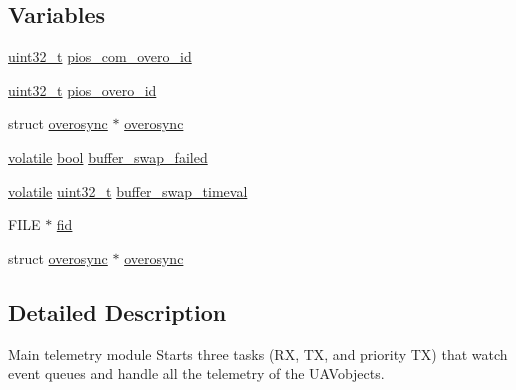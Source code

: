 \subsection*{Variables}
\begin{DoxyCompactItemize}
\item 
\hyperlink{stdint_8h_a435d1572bf3f880d55459d9805097f62}{uint32\-\_\-t} \hyperlink{group___telemetry_module_gad93c8058f5c4d01e2ecc5670a0fa5407}{pios\-\_\-com\-\_\-overo\-\_\-id}
\item 
\hyperlink{stdint_8h_a435d1572bf3f880d55459d9805097f62}{uint32\-\_\-t} \hyperlink{group___telemetry_module_ga6068626ce5d15d09ba077204ea2fd43d}{pios\-\_\-overo\-\_\-id}
\item 
struct \hyperlink{structoverosync}{overosync} $\ast$ \hyperlink{group___telemetry_module_ga34ce26c29a4ded07cf5f562126682017}{overosync}
\item 
\hyperlink{group___c_m_s_i_s___core___instruction_interface_gad7d93af13046b0378601b85c8c16673b}{volatile} \hyperlink{group___exported__types_gaf6a258d8f3ee5206d682d799316314b1}{bool} \hyperlink{group___telemetry_module_gaf3669c85af58042a7e4440bb29725642}{buffer\-\_\-swap\-\_\-failed}
\item 
\hyperlink{group___c_m_s_i_s___core___instruction_interface_gad7d93af13046b0378601b85c8c16673b}{volatile} \hyperlink{stdint_8h_a435d1572bf3f880d55459d9805097f62}{uint32\-\_\-t} \hyperlink{group___telemetry_module_ga5c2ff66cb86affccb720ee8e0e55cbd7}{buffer\-\_\-swap\-\_\-timeval}
\item 
F\-I\-L\-E $\ast$ \hyperlink{group___telemetry_module_ga646170d6f9e3b0d001430a771e9f2247}{fid}
\item 
struct \hyperlink{structoverosync}{overosync} $\ast$ \hyperlink{group___telemetry_module_ga34ce26c29a4ded07cf5f562126682017}{overosync}
\end{DoxyCompactItemize}


\subsection{Detailed Description}
Main telemetry module Starts three tasks (R\-X, T\-X, and priority T\-X) that watch event queues and handle all the telemetry of the U\-A\-Vobjects. 

